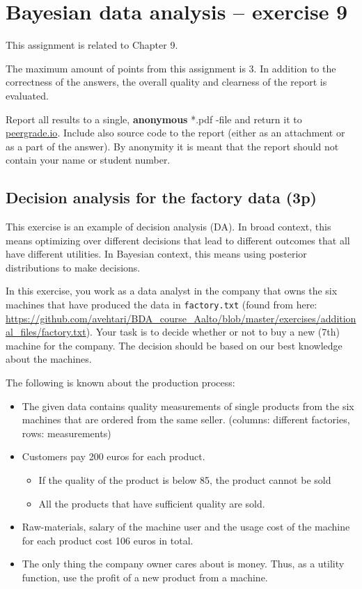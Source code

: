 \documentclass[a4paper,11pt]{article}
\begin{document}
\thispagestyle{empty}

\section*{Bayesian data analysis -- exercise 9}
This assignment is related to Chapter 9.

The maximum amount of points from this assignment is 3. In addition to the correctness of the answers, the overall quality and clearness of the report is evaluated.

Report all results to a single, {\bf anonymous} *.pdf -file and return it to \href{peergrade.io}{peergrade.io}. Include also source code to the report (either as an attachment or as a part of the answer). By anonymity it is meant that the report should not contain your name or student number.

\vspace{1cm}

\subsection*{Decision analysis for the factory data (3p)}

This exercise is an example of decision analysis (DA). In broad context, this means optimizing over different decisions that lead to different outcomes that all have different utilities. In Bayesian context, this means using posterior distributions to make decisions.  

In this exercise, you work as a data analyst in the company that owns the six machines that have produced the data in \texttt{factory.txt} (found from here: \url{https://github.com/avehtari/BDA_course_Aalto/blob/master/exercises/additional_files/factory.txt}). Your task is to decide whether or not to buy a new (7th) machine for the company. The decision should be based on our best knowledge about the machines.

The following is known about the production process: 
\begin{itemize} 
\item The given data contains quality measurements of single products from the six machines that are ordered from the same seller. (columns: different factories, rows: measurements)
\item Customers pay 200 euros for each product.
\begin{itemize}
\item If the quality of the product is below 85, the product cannot be sold 
\item All the products that have sufficient quality are sold.
\end{itemize}
\item Raw-materials, salary of the machine user and the usage cost of the machine for each product cost 106 euros in total.
\item The only thing the company owner cares  about is money. Thus, as a utility function, use the profit of a new product from a machine.
\end{itemize}
\end{document}
